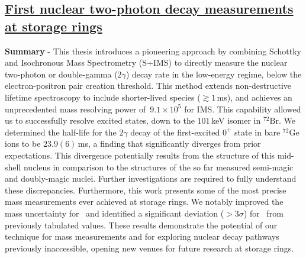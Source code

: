 \subsection*{\normalsize \underline{First nuclear two-photon decay measurements at storage rings}}
\textbf{Summary} - This thesis introduces a pioneering approach by combining Schottky and Isochronous Mass Spectrometry (S+IMS) to directly measure the nuclear two-photon or double-gamma ($2\gamma$) decay rate in the low-energy regime, below the electron-positron pair creation threshold. This method extends non-destructive lifetime spectroscopy to include shorter-lived species ($\gtrsim 1$\,ms), and achieves an unprecedented mass resolving power of \,$9.1\times10^5$ for IMS. This capability allowed us to successfully resolve excited states, down to the $101$\,keV isomer in $^{72}\mathrm{Br}$.
We determined the half-life for the $2\gamma$ decay of the first-excited $0^+$ state in bare $^{72}\mathrm{Ge}$ ions to be $23.9\left(6\right)$\,ms, a finding that significantly diverges from prior expectations. This divergence potentially results from the structure of this mid-shell nucleus in comparison to the structures of the so far measured semi-magic and doubly-magic nuclei. Further investigations are required to fully understand these discrepancies.
\newpar
Furthermore, this work presents some of the most precise mass measurements ever achieved at storage rings. We notably improved the mass uncertainty for \, and identified a significant deviation ($>3\sigma$) for \, from previously tabulated values. 
\newpar
These results demonstrate the potential of our technique for mass measurements and for exploring nuclear decay pathways previously inaccessible, opening new venues for future research at storage rings.
